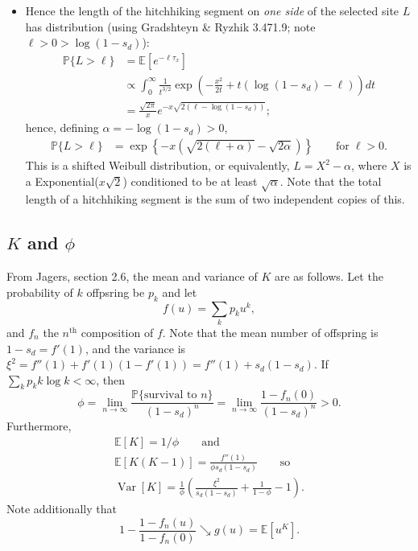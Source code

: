 \documentclass{article}
\newcommand{\E}{\mathbb{E}}
\renewcommand{\P}{\mathbb{P}}
\newcommand{\var}{\mathop{\mbox{Var}}}
\begin{document}
\begin{itemize}
\item Hence the length of the hitchhiking segment on \emph{one side} of the selected site $L$ has distribution
(using Gradshteyn \& Ryzhik 3.471.9; note $\ell > 0 > \log(1-s_d)$):
\begin{align*}
 \P\{ L > \ell \} &= \E\left[ e^{-\ell \tau_x} \right] \\
 & \propto \int_0^\infty \frac{1}{t^{3/2}} \exp\left(-\frac{x^2}{2t} + t(\log(1-s_d) -\ell) \right)  dt \\
 &= \frac{\sqrt{2\pi}}{x} e^{-x\sqrt{2(\ell-\log(1-s_d))}} ;
\end{align*}
hence, defining $\alpha = - \log(1-s_d) > 0$,
\begin{align*}
 \P\{ L > \ell \} &= \exp\left\{{-x\left(\sqrt{2(\ell+\alpha)} - \sqrt{2\alpha}\right)}\right\} \qquad \mbox{for}\; \ell>0.
\end{align*}
This is a shifted Weibull distribution, or equivalently, $L=X^2-\alpha$, where $X$ is a Exponential($x\sqrt{2}$) conditioned to be at least $\sqrt{\alpha}$.
Note that the total length of a hitchhiking segment is the sum of two independent copies of this.

\end{itemize}



\subsection{$K$ and $\phi$}

From Jagers, section 2.6,
the mean and variance of $K$ are as follows.
Let the probability of $k$ offpsring be $p_k$ and let
\[
 f(u) =  \sum_k p_k u^k,
\]
and $f_n$ the $n^\mathrm{th}$ composition of $f$.
Note that the mean number of offspring is $1-s_d = f'(1)$, and the variance is $\xi^2 = f''(1) + f'(1)(1-f'(1)) = f''(1) + s_d(1-s_d)$.
If $\sum_k p_k k \log k < \infty$, then 
\[
\phi = \lim_{n \to \infty} \frac{ \P\{ \mbox{survival to }n \}  }{ (1-s_d)^n } = \lim_{n \to \infty} \frac{ 1-f_n(0) }{ (1-s_d)^n } > 0 .
\]
Furthermore,
\begin{gather*}
\E[K] = 1/\phi \qquad \mbox{and} \\
\E[K(K-1)] = \frac{ f''(1) }{ \phi s_d (1-s_d) } \qquad \mbox{so} \\
\var[K] = \frac{1}{\phi} \left( \frac{ \xi^2 }{ s_d (1-s_d) } + \frac{1}{1-\phi} - 1 \right) .
\end{gather*}
Note additionally that 
\[
    1 - \frac{1-f_n(u)}{1-f_n(0)} \searrow g(u) = \E[u^K] .
\]
\end{document}
